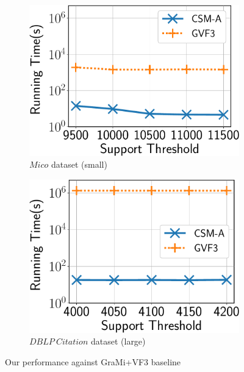 \begin{figure}
 \vspace{-0.20in}
 \centering
	\begin{subfigure}[t]{0.21\textwidth}
		\includegraphics[scale=0.24]{img2/mico/mico_gvf3.pdf}
		\caption{\scriptsize $Mico$ dataset (small)}
		\label{fig:intro_micogvf3}
    \end{subfigure}%
    \hspace*{\fill}
	\begin{subfigure}[t]{0.23\textwidth}
		\includegraphics[scale=0.24]{img2/citationdblp/citationdblp_gvf3.pdf}
		\caption{\scriptsize $DBLP\ Citation$ dataset (large)}
		\label{fig:intro_citationdblpgvf3}
	\end{subfigure}%
	\caption{Our performance against GraMi+VF3 baseline}
	\label{fig:motivation}
	\vspace{-0.1in}
\end{figure}

